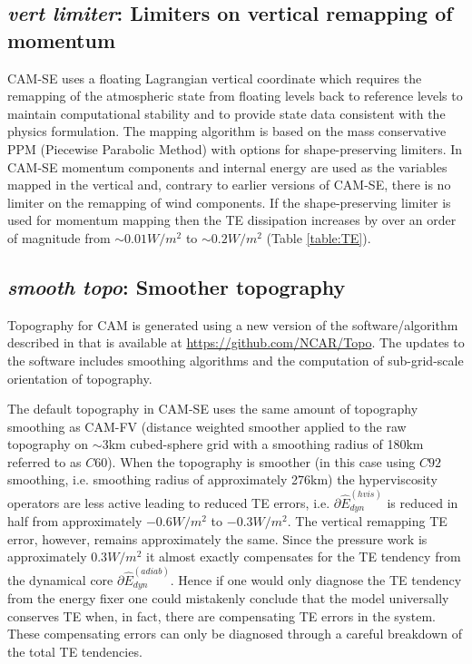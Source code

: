 \documentclass{agujournal}
\newcommand*{\gi}[1]{\widehat{#1}}
\begin{document}
\subsection{{\em{vert limiter}}: Limiters on vertical remapping of momentum}\label{sec:ppm}
CAM-SE uses a floating Lagrangian vertical coordinate \citep{S1945JAS,L2004MWR} which requires the remapping of the atmospheric state from floating levels back to reference levels to maintain computational stability and to provide state data consistent with the physics formulation. The mapping algorithm is based on the mass conservative PPM (Piecewise Parabolic Method) with options for shape-preserving limiters. In CAM-SE momentum components and internal energy are used as the variables mapped in the vertical \citep{LetAl2018JAMES} and, contrary to earlier versions of CAM-SE, there is no limiter on the remapping of wind components. If the shape-preserving limiter is used for momentum mapping then the TE dissipation increases by over an order of magnitude from $\sim 0.01W/m^2$ to $\sim 0.2W/m^2$ (Table \ref{table:TE}).
\subsection{{\em{smooth topo}}: Smoother topography}\label{sec:topo}
Topography for CAM is generated using a new version of the software/algorithm described in \cite{LetAl2015GMD} that is available at \url{https://github.com/NCAR/Topo}. The updates to the software includes smoothing algorithms and the computation of sub-grid-scale orientation of topography. 

The default topography in CAM-SE uses the same amount of topography smoothing as CAM-FV (distance weighted smoother applied to the raw topography on $\sim 3$km cubed-sphere grid with a smoothing radius of 180km referred to as $C60$). When the topography is smoother (in this case using $C92$ smoothing, i.e. smoothing radius of approximately 276km) the hyperviscosity operators are less active leading to reduced TE errors, i.e. $\partial \gi{E}^{(hvis)}_{dyn}$ is reduced in half from approximately $-0.6W/m^2$ to $-0.3W/m^2$. The vertical remapping TE error, however, remains approximately the same. Since the pressure work is approximately $0.3W/m^2$ it almost exactly compensates for the TE tendency from the dynamical core $\partial \gi{E}^{(adiab)}_{dyn}$. Hence if one would only diagnose the TE tendency from the energy fixer one could mistakenly conclude that the model universally  conserves TE when, in fact, there are compensating TE errors in the system. These compensating errors  can only be diagnosed through a careful breakdown of the total TE tendencies.
\end{document}
